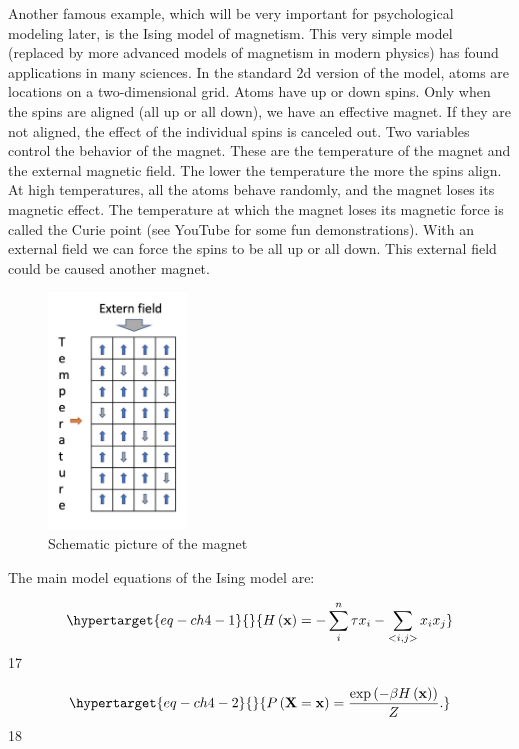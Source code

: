 \documentclass[
  letterpaper,
]{scrbook}
\begin{document}
Another famous example, which will be very important for psychological
modeling later, is the Ising model of magnetism. This very simple model
(replaced by more advanced models of magnetism in modern physics) has
found applications in many sciences. In the standard 2d version of the
model, atoms are locations on a two-dimensional grid. Atoms have up or
down spins. Only when the spins are aligned (all up or all down), we
have an effective magnet. If they are not aligned, the effect of the
individual spins is canceled out. Two variables control the behavior of
the magnet. These are the temperature of the magnet and the external
magnetic field. The lower the temperature the more the spins align. At
high temperatures, all the atoms behave randomly, and the magnet loses
its magnetic effect. The temperature at which the magnet loses its
magnetic force is called the Curie point (see YouTube for some fun
demonstrations). With an external field we can force the spins to be all
up or all down. This external field could be caused another magnet.

\begin{figure}

{\centering \includegraphics[width=1.44807in,height=2.46919in]{media/ch4/image1.jpg}

}

\caption{\label{fig-ch4-img1}Schematic picture of the magnet}

\end{figure}

The main model equations of the Ising model are:

\begin{equation}\protect\hypertarget{eq-ch4-1}{}{
H\left( \mathbf{x} \right) = - \sum_{i}^{n}{\tau x_{i}} - \sum_{< i,j >}^{}{x_{i}x_{j}}}\label{eq-ch4-1}\end{equation}
17

\begin{equation}\protect\hypertarget{eq-ch4-2}{}{
P\left( \mathbf{X} = \mathbf{x} \right) = \frac{\exp\left( - \beta H\left( \mathbf{x} \right) \right)}{Z}.}\label{eq-ch4-2}\end{equation}
18
\end{document}
